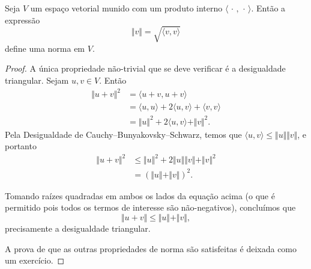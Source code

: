 \begin{theorem}
	Seja $V$ um espaço vetorial munido com um produto interno $\langle\,\cdot\,,\,\cdot\,\rangle$. Então a expressão
	\[\Vert v\Vert=\sqrt{\langle v,v\rangle}\]
	define uma norma em $V$.
\end{theorem}

\begin{proof}
	A única propriedade não-trivial que se deve verificar é a desigualdade triangular. Sejam $u,v\in V$. Então
	\begin{align*}
	\Vert u+v\Vert^2
		&=\langle u+v,u+v\rangle\\
		&=\langle u,u\rangle+2\langle u,v\rangle+\langle v,v\rangle\\
		&=\Vert u\Vert^2+2\langle u,v\rangle+\Vert v\Vert^2.
	\end{align*}
	Pela Desigualdade de Cauchy--Bunyakovsky--Schwarz, temos que $\langle u,v\rangle\leq\Vert u\Vert \Vert v\Vert$, e portanto
	\begin{align*}
	\Vert u+v\Vert^2
		&\leq\Vert u\Vert^2+2\Vert u\Vert\Vert v\Vert+\Vert v\Vert^2\\
		&=\left(\Vert u\Vert+\Vert v\Vert\right)^2.
	\end{align*}
	
	Tomando raízes quadradas em ambos os lados da equação acima (o que é permitido pois todos os termos de interesse são não-negativos), concluímos que
	\[\Vert u+v\Vert\leq\Vert u\Vert+\Vert v\Vert,\]
	precisamente a desigualdade triangular.
	
	A prova de que as outras propriedades de norma são satisfeitas é deixada como um exercício.
\end{proof}
